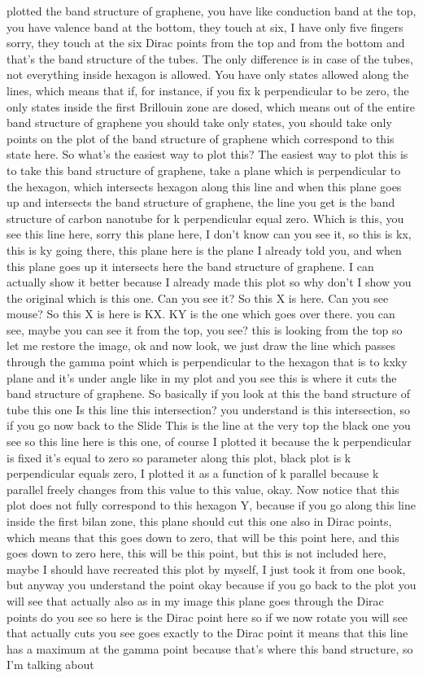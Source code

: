 plotted the band structure of graphene, you have like conduction band at the top, you have valence band at the bottom, they touch at six, I have only five fingers sorry, they touch at the six Dirac points from the top and from the bottom and that's the band structure of the tubes. The only difference is in case of the tubes, not everything inside hexagon is allowed. You have only states allowed along the lines, which means that if, for instance, if you fix k perpendicular to be zero, the only states inside the first Brillouin zone are dosed, which means out of the entire band structure of graphene you should take only states, you should take only points on the plot of the band structure of graphene which correspond to this state here. So what's the easiest way to plot this? The easiest way to plot this is to take this band structure of graphene, take a plane which is perpendicular to the hexagon, which intersects hexagon along this line and when this plane goes up and intersects the band structure of graphene, the line you get is the band structure of carbon nanotube for k perpendicular equal zero. Which is this, you see this line here, sorry this plane here, I don't know can you see it, so this is kx, this is ky going there, this plane here is the plane I already told you, and when this plane goes up it intersects here the band structure of graphene. I can actually show it better because I already made this plot so why don't I show you the original which is this one. Can you see it? So this X is here. Can you see mouse? So this X is here is KX. KY is the one which goes over there. you can see, maybe you can see it from the top, you see? this is looking from the top so let me restore the image, ok and now look, we just draw the line which passes through the gamma point which is perpendicular to the hexagon that is to kxky plane and it's under angle like in my plot and you see this is where it cuts the band structure of graphene. So basically if you look at this the band structure of tube this one Is this line this intersection? you understand is this intersection, so if you go now back to the Slide This is the line at the very top the black one you see so this line here is this one, of course I plotted it because the k perpendicular is fixed it's equal to zero so parameter along this plot, black plot is k perpendicular equals zero, I plotted it as a function of k parallel because k parallel freely changes from this value to this value, okay. Now notice that this plot does not fully correspond to this hexagon Y, because if you go along this line inside the first bilan zone, this plane should cut this one also in Dirac points, which means that this goes down to zero, that will be this point here, and this goes down to zero here, this will be this point, but this is not included here, maybe I should have recreated this plot by myself, I just took it from one book, but anyway you understand the point okay because if you go back to the plot you will see that actually also as in my image this plane goes through the Dirac points do you see so here is the Dirac point here so if we now rotate you will see that actually cuts you see goes exactly to the Dirac point it means that this line has a maximum at the gamma point because that's where this band structure, so I'm talking about 